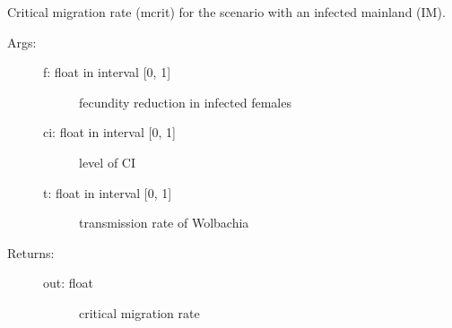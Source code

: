 \documentclass[letterpaper,10pt,english]{sphinxmanual}
\begin{document}
\begin{fulllineitems}
\label{index:wspec.analytical.mcrit_IM}
Critical migration rate (mcrit) for the scenario with an infected 
mainland (IM).
\begin{description}
\item[{Args:}] \leavevmode\begin{description}
\item[{f: float in interval {[}0, 1{]}}] \leavevmode
fecundity reduction in infected females

\item[{ci: float in interval {[}0, 1{]}}] \leavevmode
level of CI

\item[{t: float in interval {[}0, 1{]}}] \leavevmode
transmission rate of Wolbachia

\end{description}

\item[{Returns:}] \leavevmode\begin{description}
\item[{out: float}] \leavevmode
critical migration rate

\end{description}

\end{description}

\end{fulllineitems}

\end{document}
